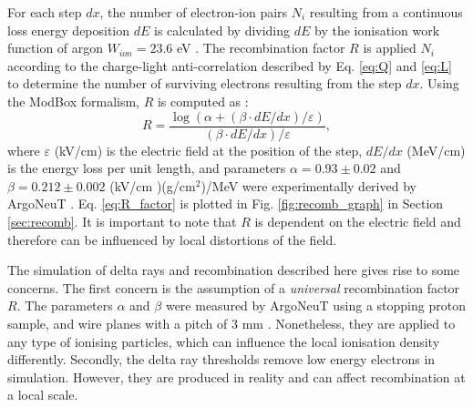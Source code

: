 For each step $dx$, the number of electron-ion pairs $N_i$ resulting from a continuous loss energy deposition $dE$ is calculated by dividing $dE$ by the ionisation work function of argon $W_{ion} = 23.6$ eV \cite{wion_lar}.
The recombination factor $R$ is applied $N_i$ according to the charge-light anti-correlation described by Eq. \ref{eq:Q} and \ref{eq:L} to determine the number of surviving electrons resulting from the step $dx$.    
Using the ModBox formalism, $R$ is computed as \cite{argoneut_recomb}:
\begin{equation}
        \label{eq:R_factor}
        R = \frac{\log{ \left( \alpha + \left(\beta \cdot dE/dx\right)/\varepsilon \right)}}{\left(\beta \cdot dE/dx\right)/\varepsilon},
\end{equation}
where $\varepsilon$ (kV/cm) is the electric field at the position of the step, $dE/dx$ (MeV/cm) is the energy loss per unit length, and parameters $\alpha = 0.93\pm0.02$ and $\beta = 0.212\pm0.002$ (kV/cm
)(g/cm$^{2}$)/MeV were experimentally derived by ArgoNeuT \cite{argoneut_recomb}.
Eq. \ref{eq:R_factor} is plotted in Fig. \ref{fig:recomb_graph} in Section \ref{sec:recomb}.
It is important to note that $R$ is dependent on the electric field and therefore can be influenced by local distortions of the field.

The simulation of delta rays and recombination described here gives rise to some concerns.
The first concern is the assumption of a \textit{universal} recombination factor $R$.
The parameters $\alpha$ and $\beta$ were measured by ArgoNeuT using a stopping proton sample, and wire planes with a pitch of 3 mm \cite{argoneut_recomb}.
Nonetheless, they are applied to any type of ionising particles, which can influence the local ionisation density differently. 
Secondly, the delta ray thresholds remove low energy electrons in simulation.
However, they are produced in reality and can affect recombination at a local scale. 

